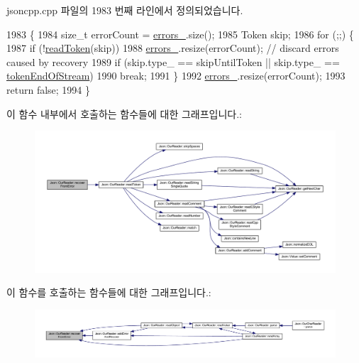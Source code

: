 jsoncpp.\+cpp 파일의 1983 번째 라인에서 정의되었습니다.


\begin{DoxyCode}
1983                                                          \{
1984   \textcolor{keywordtype}{size\_t} errorCount = \hyperlink{class_json_1_1_our_reader_afb76b68ba1ab68fe09cf2838e3d4898d}{errors\_}.size();
1985   Token skip;
1986   \textcolor{keywordflow}{for} (;;) \{
1987     \textcolor{keywordflow}{if} (!\hyperlink{class_json_1_1_our_reader_a0d1e66da47fe2e85f5033c59326dfdc3}{readToken}(skip))
1988       \hyperlink{class_json_1_1_our_reader_afb76b68ba1ab68fe09cf2838e3d4898d}{errors\_}.resize(errorCount); \textcolor{comment}{// discard errors caused by recovery}
1989     \textcolor{keywordflow}{if} (skip.type\_ == skipUntilToken || skip.type\_ == \hyperlink{class_json_1_1_our_reader_a15116f7276ddf1e7a2cc3cbefa884dcca735d1f76eafc2c0c581ed79c077aaa7e}{tokenEndOfStream})
1990       \textcolor{keywordflow}{break};
1991   \}
1992   \hyperlink{class_json_1_1_our_reader_afb76b68ba1ab68fe09cf2838e3d4898d}{errors\_}.resize(errorCount);
1993   \textcolor{keywordflow}{return} \textcolor{keyword}{false};
1994 \}
\end{DoxyCode}
이 함수 내부에서 호출하는 함수들에 대한 그래프입니다.\+:\nopagebreak
\begin{figure}[H]
\begin{center}
\leavevmode
\includegraphics[width=350pt]{class_json_1_1_our_reader_a035651f0700a76a815e5f904c63ebb1c_cgraph}
\end{center}
\end{figure}
이 함수를 호출하는 함수들에 대한 그래프입니다.\+:\nopagebreak
\begin{figure}[H]
\begin{center}
\leavevmode
\includegraphics[width=350pt]{class_json_1_1_our_reader_a035651f0700a76a815e5f904c63ebb1c_icgraph}
\end{center}
\end{figure}
\mbox{\label{class_json_1_1_our_reader_a856dea44d92578c276856d7a65a4ebdc}} 
